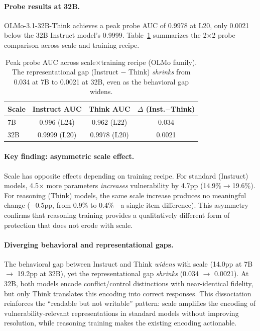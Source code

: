 \documentclass{article}
\begin{document}
\paragraph{Probe results at 32B.}
OLMo-3.1-32B-Think achieves a peak probe AUC of 0.9978 at L20,
only 0.0021 below the 32B Instruct model's 0.9999.
Table~\ref{tab:scale_probe_comparison} summarizes the 2$\times$2
probe comparison across scale and training recipe.

\begin{table}[ht]
\centering
\caption{Peak probe AUC across scale$\times$training recipe (OLMo family).
  The representational gap (Instruct $-$ Think) \emph{shrinks} from
  0.034 at 7B to 0.0021 at 32B, even as the behavioral gap widens.}
\label{tab:scale_probe_comparison}
\vspace{4pt}
\small
\begin{tabular}{lccc}
\toprule
\textbf{Scale} & \textbf{Instruct AUC} & \textbf{Think AUC} & \textbf{$\Delta$ (Inst.$-$Think)} \\
\midrule
7B  & 0.996 (L24) & 0.962 (L22) & 0.034  \\
32B & 0.9999 (L20) & 0.9978 (L20) & 0.0021 \\
\bottomrule
\end{tabular}
\end{table}

\paragraph{Key finding: asymmetric scale effect.}
Scale has opposite effects depending on training recipe.
For standard (Instruct) models, 4.5$\times$ more parameters
\emph{increases} vulnerability by 4.7pp (14.9\%$\to$19.6\%).
For reasoning (Think) models, the same scale increase produces
no meaningful change ($-$0.5pp, from 0.9\% to 0.4\%---a single
item difference).  This asymmetry confirms that reasoning training
provides a qualitatively different form of protection that does not
erode with scale.

\paragraph{Diverging behavioral and representational gaps.}
The behavioral gap between Instruct and Think \emph{widens} with
scale (14.0pp at 7B $\to$ 19.2pp at 32B), yet the representational
gap \emph{shrinks} (0.034 $\to$ 0.0021).  At 32B, both models encode
conflict/control distinctions with near-identical fidelity, but only
Think translates this encoding into correct responses.  This
dissociation reinforces the ``readable but not writable'' pattern:
scale amplifies the encoding of vulnerability-relevant representations
in standard models without improving resolution, while reasoning
training makes the existing encoding actionable.
\end{document}
